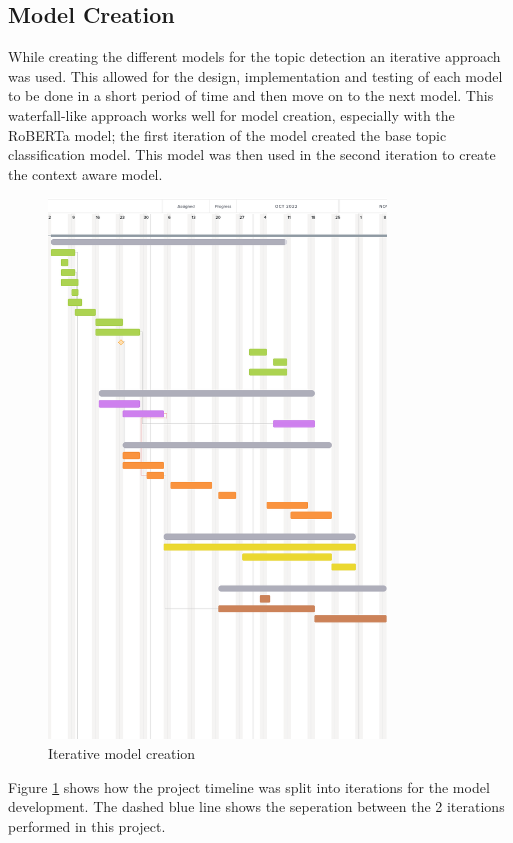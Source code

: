 \subsection{Model Creation}
While creating the different models for the topic detection an iterative approach was used. This allowed for the design, implementation and testing
of each model to be done in a short period of time and then move on to the next model. This waterfall-like approach works well for model creation,
especially with the RoBERTa model; the first iteration of the model created the base topic classification model. This model was then used
in the second iteration to create the context aware model.
\begin{figure}
    \centering
    \includegraphics[width=0.8\textwidth]{../images/3yp timeline pres.png}
    \caption{Iterative model creation}
    \label{fig:iterative-model-creation}
\end{figure}

Figure \ref{fig:iterative-model-creation} shows how the project timeline was split into iterations for the model development. The dashed blue line
shows the seperation between the 2 iterations performed in this project.
